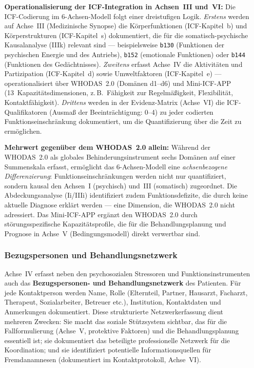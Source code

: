 \documentclass[11pt,a4paper]{article}
\begin{document}
\textbf{Operationalisierung der ICF-Integration in Achsen~III und~VI:} Die ICF-Codierung im 6-Achsen-Modell folgt einer dreistufigen Logik. \textit{Erstens} werden auf Achse~III (Medizinische Synopse) die K\"orperfunktionen (ICF-Kapitel~b) und K\"orperstrukturen (ICF-Kapitel~s) dokumentiert, die f\"ur die somatisch-psychische Kausalanalyse (IIIk) relevant sind --- beispielsweise \texttt{b130} (Funktionen der psychischen Energie und des Antriebs), \texttt{b152} (emotionale Funktionen) oder \texttt{b144} (Funktionen des Ged\"achtnisses). \textit{Zweitens} erfasst Achse~IV die Aktivit\"aten und Partizipation (ICF-Kapitel~d) sowie Umweltfaktoren (ICF-Kapitel~e) --- operationalisiert \"uber WHODAS~2.0 (Dom\"anen d1--d6) und Mini-ICF-APP (13~Kapazit\"atsdimensionen, z.\,B.\ F\"ahigkeit zur Regelm\"a\ss{}igkeit, Flexibilit\"at, Kontaktf\"ahigkeit). \textit{Drittens} werden in der Evidenz-Matrix (Achse~VI) die ICF-Qualifikatoren (Ausma\ss{} der Beeintr\"achtigung: 0--4) zu jeder codierten Funktionseinschr\"ankung dokumentiert, um die Quantifizierung \"uber die Zeit zu erm\"oglichen.

\textbf{Mehrwert gegen\"uber dem WHODAS~2.0 allein:} W\"ahrend der WHODAS~2.0 als globales Behinderungsinstrument sechs Dom\"anen auf einer Summenskala erfasst, erm\"oglicht das 6-Achsen-Modell eine \textit{achsenbezogene Differenzierung}: Funktionseinschr\"ankungen werden nicht nur quantifiziert, sondern kausal den Achsen~I (psychisch) und~III (somatisch) zugeordnet. Die Abdeckungsanalyse (Ii/IIIi) identifiziert zudem Funktionsdefizite, die durch keine aktuelle Diagnose erkl\"art werden --- eine Dimension, die WHODAS~2.0 nicht adressiert. Das Mini-ICF-APP erg\"anzt den WHODAS~2.0 durch st\"orungsspezifische Kapazit\"atsprofile, die f\"ur die Behandlungsplanung und Prognose in Achse~V (Bedingungsmodell) direkt verwertbar sind.

\subsubsection{Bezugspersonen und Behandlungsnetzwerk}

Achse~IV erfasst neben den psychosozialen Stressoren und Funktionsinstrumenten auch das \textbf{Bezugspersonen- und Behandlungsnetzwerk} des Patienten. F\"ur jede Kontaktperson werden Name, Rolle (Elternteil, Partner, Hausarzt, Facharzt, Therapeut, Sozialarbeiter, Betreuer etc.), Institution, Kontaktdaten und Anmerkungen dokumentiert. Diese strukturierte Netzwerkerfassung dient mehreren Zwecken: Sie macht das soziale St\"utzsystem sichtbar, das f\"ur die Fallformulierung (Achse~V, protektive Faktoren) und die Behandlungsplanung essentiell ist; sie dokumentiert das beteiligte professionelle Netzwerk f\"ur die Koordination; und sie identifiziert potentielle Informationsquellen f\"ur Fremdanamnesen (dokumentiert im Kontaktprotokoll, Achse~VI).
\end{document}
